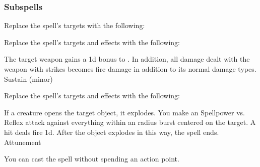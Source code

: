 \subsubsection{Subspells}
Replace the spell's targets with the following:
\begin{spellcontent}
\begin{augmenttargetinginfo}
\end{augmenttargetinginfo}
\end{spellcontent}
Replace the spell's targets and effects with the following:
\begin{spellcontent}
\begin{augmenttargetinginfo}
\end{augmenttargetinginfo}
\begin{augmenteffects}
\spelleffect
The target weapon gains a \plus1d bonus to .
In addition, all damage dealt with the weapon with strikes becomes fire damage in addition to its normal damage types.
\spelldur Sustain (minor)
\end{augmenteffects}
\end{spellcontent}
Replace the spell's targets and effects with the following:
\begin{spellcontent}
\begin{augmenttargetinginfo}
\end{augmenttargetinginfo}
\begin{augmenteffects}
\spelleffect
If a creature opens the target object, it explodes.
You make an Spellpower vs. Reflex attack against everything within an \areamed radius burst centered on the target.
A hit deals fire  \minus1d.
After the object explodes in this way, the spell ends.
\spelldur Attunement
\end{augmenteffects}
\end{spellcontent}
You can cast the spell without spending an action point.
